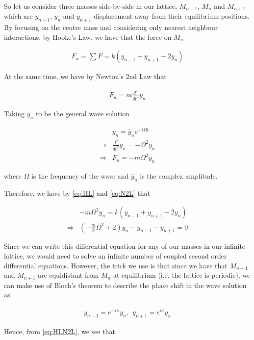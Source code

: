 So let us consider three masses side-by-side in our lattice, $M_{n-1}$, $M_n$
and $M_{n+1}$ which are $y_{n-1}$, $y_n$ and $y_{n+1}$ displacement away from
their equilibrium positions. By focusing on the centre mass and considering
only nearest neighbour interactions, by Hooke's Law, we have that the force on
$M_n$

\begin{align}
  F_{n}=\sum F=k\left(y_{n-1}+y_{n+1}-2y_{n}\right) \label{eq:HL}
\end{align}

At the same time, we have by Newton's 2nd Law that

\begin{align}
  F_{n}=m\frac{d^{2}}{dt^{2}}y_{n}
\end{align}

Taking $y_n$ to be the general wave solution

\begin{align}
  &y_{n}=\hat{y}_{n}e^{-i\Omega t} \\
  \Rightarrow &\frac{d^{2}}{dt^{2}}y_{n}=-\Omega^{2}y_{n} \\
  \Rightarrow &F_{n}=-m\Omega^{2}y_{n} \label{eq:N2L}
\end{align}

where $\Omega$ is the frequency of the wave and $\hat{y}_{n}$ is the complex
amplitude.

Therefore, we have by \eqref{eq:HL} and \eqref{eq:N2L} that

\begin{align}
  &-m\Omega^{2}y_{n}=k\left(y_{n-1}+y_{n+1}-2y_{n}\right) \\
  \Rightarrow &\left(-\frac{m}{k}\Omega^{2}+2\right)y_{n}-y_{n-1}-y_{n+1}=0
    \label{eq:HLN2L}
\end{align}

Since we can write this differential equation for any of our masses in our
infinite lattice, we would need to solve an infinite number of coupled second
order differential equations. However, the trick we use is that since we have
that $M_{n-1}$ and $M_{n+1}$ are equidistant from $M_{n}$ at equilibrium (i.e.
the lattice is periodic), we can make use of Bloch's theorem\cite{bloch} to
describe the phase shift in the wave solution as

\begin{align}
  y_{n-1}=e^{-i\kappa}y_n,\ \ y_{n+1}=e^{i\kappa}y_n
\end{align}

Hence, from \eqref{eq:HLN2L}, we see that


